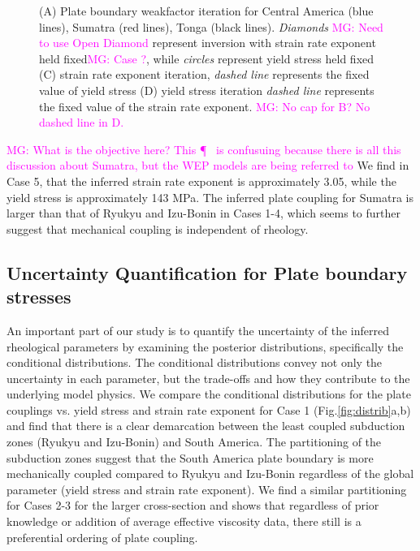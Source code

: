 \documentclass[12pt]{article}
\newcommand{\mgnote}[1]{\textcolor{magenta}{MG: #1}}
\begin{document}
{\begin{figure}[H]
{}
\hspace{-0.2cm}
\caption{(A) Plate boundary weakfactor iteration for Central America (blue lines), Sumatra (red lines), Tonga (black lines). \textit{Diamonds} \mgnote{Need to use Open Diamond} represent inversion with strain rate exponent held fixed\mgnote{Case ?}, while \textit{circles} represent yield stress held fixed (C) strain rate exponent iteration, \textit{dashed line} represents the fixed value of yield stress (D) yield stress iteration \textit{dashed line} represents the fixed value of the strain rate exponent.
\mgnote{No cap for B? No dashed line in D.}}
\label{fig:inverse1}
\end{figure}
\mgnote{What is the objective here? This \P~ is confusuing because there is all this discussion about Sumatra, but the WEP models are being referred to} We find in Case 5, that the inferred strain rate exponent is approximately 3.05, while the yield stress is approximately 143 MPa. The inferred plate coupling for Sumatra is larger than that of Ryukyu and Izu-Bonin in Cases 1-4, which seems to further suggest that mechanical coupling is independent of rheology. 










\subsection{Uncertainty Quantification for Plate boundary stresses}

An important part of our study is to quantify the uncertainty of the inferred rheological parameters by examining the posterior distributions, specifically the conditional distributions. The conditional distributions convey not only the uncertainty in each parameter, but the trade-offs and how they contribute to the underlying model physics. We compare the conditional distributions for the plate couplings vs. yield stress and strain rate exponent for Case 1  (Fig.\ref{fig:distrib}a,b) and find that there is a clear demarcation between the least coupled subduction zones (Ryukyu and Izu-Bonin) and South America. The partitioning of the subduction zones suggest that the South America plate boundary is more mechanically coupled compared to Ryukyu and Izu-Bonin regardless of the global parameter (yield stress and strain rate exponent). We find a similar partitioning for Cases 2-3 for the larger cross-section and shows that regardless of prior knowledge or addition of average effective viscosity data, there still is a preferential ordering of  plate coupling. 

}
\end{document}

